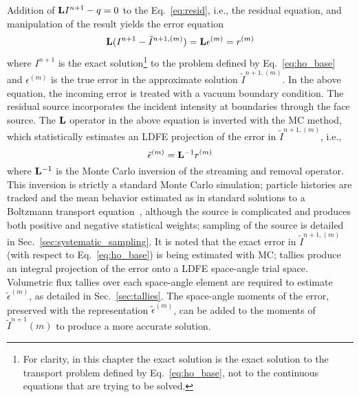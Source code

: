 Addition of $\mathbf{L} I^{n+1} - q=0$ to the Eq.~\eqref{eq:resid}, i.e., the residual equation,
and manipulation of the result yields the error equation
\begin{equation}\label{eq:err_eq}
    \mathbf{L} (I^{n+1} - \tilde{I}^{n+1,(m)}) = \mathbf{L} {\epsilon}^{(m)} = r^{(m)}
\end{equation}
where $I^{n+1}$ is the exact solution\footnote{For clarity, in this chapter the exact solution is the
    exact solution to the transport problem defined by Eq.~\eqref{eq:ho_base}, not to the
continuous equations that are trying to be solved.}  to the problem defined by Eq.~\eqref{eq:ho_base} and
${\epsilon}^{(m)}$ is the true error in the approximate solution $\tilde{I}^{n+1,(m)}$. 
In the above equation, the incoming error is treated with a vacuum boundary condition.  The
residual source incorporates the incident intensity at boundaries through
the face source.
The $\mathbf{L}$ operator in the above equation is inverted with the MC method, which
statistically estimates an LDFE projection of the error in $\tilde{I}^{n+1,(m)}$, i.e., 
\begin{equation}\label{eq:mc_err}
\tilde{\epsilon}^{(m)} = \mathbf{L}^{-1} r^{(m)}
\end{equation}
where $\mathbf{L}^{-1}$ is the Monte Carlo inversion of the streaming and removal operator.  
This inversion is strictly a standard Monte Carlo simulation; particle histories are
tracked and the mean behavior estimated as in standard solutions to a Boltzmann transport
equation~\cite{shultis_mc,mcnp}, although the source is
complicated and produces both positive and negative statistical weights; sampling of the
source is detailed in Sec.~\ref{sec:systematic_sampling}.  
It is noted that the exact error in $\tilde{I}^{n+1,(m)}$ (with respect to
Eq.~\eqref{eq:ho_base}) is being estimated with MC;
tallies produce an integral projection of the error onto a LDFE space-angle trial space. 
Volumetric flux tallies over each space-angle element are required to estimate
$\tilde{\epsilon}^{(m)}$, as detailed in Sec.~\ref{sec:tallies}.  
The
space-angle moments of the error, preserved with the representation $\tilde{\epsilon}^{(m)}$, can be added to the
moments of $\tilde{I}^{n+1}(m)$ to produce a more accurate solution.  

